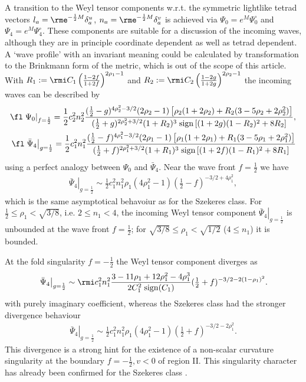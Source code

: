 \documentclass[12pt]{iopart}
\begin{document}
A transition to the Weyl tensor components w.r.t. the symmetric lightlike tetrad vectors $l_a=\rme^{-\frac12 M}\delta^u_a$, $n_a=\rme^{-\frac12 M}\delta^v_a$ is achieved via $\Psi_0=e^{M}\Psi_0^{\circ}$ and $\Psi_4=e^{M}\Psi_4^{\circ}$. These components are suitable for a discussion of the incoming waves, although they are in principle coordinate dependent as well as tetrad dependent. A `wave profile' with an invariant meaning could be calculated by transformation to the Brinkmann form of the metric, which is out of the scope of this article. With $R_1:=\rmi C_1\left(\frac{1-2f}{1+2f}\right)^{2\rho_1-1}$ and $R_2:=\rmi C_2\left(\frac{1-2g}{1+2g}\right)^{2\rho_2-1}$ the incoming waves can be described by
\begin{eqnarray}
\fl\left.\Psi_0\right\vert_{f=\frac12}=\frac12 c_2^2 n_2^2\frac{(\frac12-g)^{4\rho_2^2-3/2}(2\rho_2-1)\left[\rho_2(1+2\rho_2)+R_2(3-5\rho_2+2\rho_2^2)\right]}
   {(\frac12+g)^{2\rho_2^2+3/2}(1+R_2)^3{\rm \;sign}\left[(1+2g)(1-R_2)^2+8R_2\right]}, \\
\fl\left.\bar{\Psi}_4\right\vert_{g=\frac12}=\frac12 c_1^2 n_1^2\frac{(\frac12-f)^{4\rho_1^2-3/2}(2\rho_1-1)\left[\rho_1(1+2\rho_1)+R_1(3-5\rho_1+2\rho_1^2)\right]}
   {(\frac12+f)^{2\rho_1^2+3/2}(1+R_1)^3{\rm \;sign}\left[(1+2f)(1-R_1)^2+8R_1\right]} 
\end{eqnarray}
using a perfect analogy between $\Psi_0$ and $\bar{\Psi}_4$. Near the wave front $f=\frac12$ we have 
\begin{eqnarray}
\left.\bar{\Psi}_4\right\vert_{g=\frac12}\sim \mbox{$\frac12$} c_1^2n_1^2\rho_1(4\rho_1^2-1)(\mbox{$\frac12$}-f)^{-3/2+4\rho_1^2},
\end{eqnarray}
which is the same asymptotical behavoiur as for the Szekeres class. For $\frac12\leq\rho_1<\sqrt{3/8}$, i.e. $2\leq n_1<4$, the incoming Weyl tensor component $\left.\bar{\Psi}_4\right\vert_{g=\frac12}$ is unbounded at the wave front $f=\frac12$; for $\sqrt{3/8}\leq\rho_1<\sqrt{1/2}$ ($4\leq n_1$) it is bounded.

At the fold singularity $f=-\frac12$ the Weyl tensor component diverges as 
\begin{eqnarray}
\left.\bar{\Psi}_4\right\vert_{g=\frac12}\sim \rmi c_1^2 n_1^2\frac{3-11\rho_1+12\rho_1^2-4\rho_1^3}{2C_1^2{\rm \;sign}(C_1)}(\mbox{$\frac12$}+f)^{-3/2-2(1-\rho_1)^2}.
\end{eqnarray}
with purely imaginary coefficient, whereas the Szekeres class had the stronger divergence behaviour
\begin{eqnarray}
\left.\bar{\Psi}_4\right\vert_{g=\frac12}\sim \frac12 c_1^2 n_1^2\rho_1(4\rho_1^2-1)(\mbox{$\frac12$}+f)^{-3/2-2\rho_1^2}.
\end{eqnarray}
This divergence is a strong hint for the existence of a non-scalar curvature singularity at the boundary $f=-\frac12,v<0$ of region II. This singularity character has already been confirmed for the Szekeres class  \cite{Helliwell_1989}.
\end{document}
